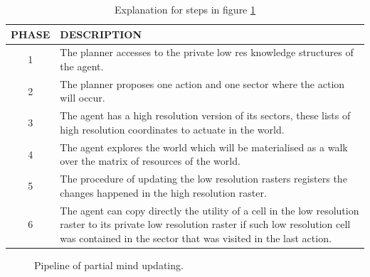 \documentclass[11pt,oneside,a4paper,openright]{report}
\begin{document}
	\begin{table}[ht!]
	\centering
	\begin{tabular}{|c|p{7cm}|}
		\hline
		PHASE	&	DESCRIPTION\\
		\hline
		1	&	The planner accesses to the private low res knowledge structures of the agent.\\
		\hline
		2	&	The planner proposes one action and one sector where the action will occur.\\
		\hline
		3	&	The agent has a high resolution version of its sectors, these lists of high resolution coordinates to actuate in the world.\\
		\hline
		4	&	The agent explores the world which will be materialised as a walk over the matrix of resources of the world.\\
		\hline
		5	&	The procedure of updating the low resolution rasters registers the changes happened in the high resolution raster.\\
		\hline
		6	&	The agent can copy directly the utility of a cell in the low resolution raster to its private low resolution raster if such low resolution cell was contained in the sector that was visited in the last action.\\
		\hline
	\end{tabular}
	\caption{Explanation for steps in figure \ref{fig:PartMind}}
	\label{tab:explainStepsPartMindUpdate}
	\end{table}

\begin{figure}[h!]
\centering
\setlength\fboxsep{0pt}
\setlength\fboxrule{0.5pt}
\caption{Pipeline of partial mind updating.}
\label{fig:PartMind}
\end{figure}
\end{document}
